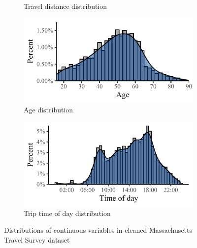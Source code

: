 \documentclass[numbered]{trbunofficial}\usepackage[]{graphicx}\usepackage[]{color}
\makeatletter
\def\maxwidth{ %
  \ifdim\Gin@nat@width>\linewidth
    \linewidth
  \else
    \Gin@nat@width
  \fi
}
\newenvironment{knitrout}{}{} %
\makeatother
\begin{document}
\begin{figure}[!h]
\begin{subfigure}[b]{0.325\textwidth}
\begin{knitrout}
\end{knitrout}
    \caption{\centering Travel distance distribution}
	  \label{fig:distdist}
  \end{subfigure}
  \begin{subfigure}[b]{0.49\textwidth}
\begin{knitrout}
\color{fgcolor}
\includegraphics[width=\maxwidth]{figure/plot_agedist-1} 

\end{knitrout}
  \caption{\centering Age distribution}
  \label{fig:agedist}
  \end{subfigure}
    \begin{subfigure}[b]{0.49\textwidth}
\begin{knitrout}
\color{fgcolor}
\includegraphics[width=\maxwidth]{figure/plot_toddist-1} 

\end{knitrout}
  \caption{\centering Trip time of day distribution}
  \label{fig:toddist}
  \end{subfigure}
	\caption{Distributions of continuous variables in cleaned Massachusetts Travel Survey dataset}
	\label{fig:contdists}
\end{figure}
\end{document}
